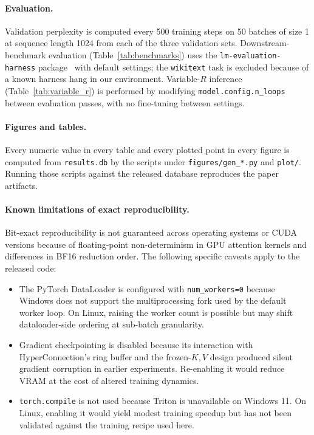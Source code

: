 \documentclass{article}
\begin{document}
\paragraph{Evaluation.}
Validation perplexity is computed every 500 training steps on 50 batches of size 1 at sequence length 1024 from each of the three validation sets. Downstream-benchmark evaluation (Table~\ref{tab:benchmarks}) uses the \texttt{lm-evaluation-harness} package~\citep{eval-harness} with default settings; the \texttt{wikitext} task is excluded because of a known harness hang in our environment. Variable-$R$ inference (Table~\ref{tab:variable_r}) is performed by modifying \texttt{model.config.n\_loops} between evaluation passes, with no fine-tuning between settings.

\paragraph{Figures and tables.}
Every numeric value in every table and every plotted point in every figure is computed from \texttt{results.db} by the scripts under \texttt{figures/gen\_*.py} and \texttt{plot/}. Running those scripts against the released database reproduces the paper artifacts.

\paragraph{Known limitations of exact reproducibility.}
Bit-exact reproducibility is not guaranteed across operating systems or CUDA versions because of floating-point non-determinism in GPU attention kernels and differences in BF16 reduction order. The following specific caveats apply to the released code:

\begin{itemize}[leftmargin=*, topsep=2pt, itemsep=1pt]
  \item The PyTorch DataLoader is configured with \texttt{num\_workers=0} because Windows does not support the multiprocessing fork used by the default worker loop. On Linux, raising the worker count is possible but may shift dataloader-side ordering at sub-batch granularity.
  \item Gradient checkpointing is disabled because its interaction with HyperConnection's ring buffer and the frozen-$K, V$ design produced silent gradient corruption in earlier experiments. Re-enabling it would reduce VRAM at the cost of altered training dynamics.
  \item \texttt{torch.compile} is not used because Triton is unavailable on Windows 11. On Linux, enabling it would yield modest training speedup but has not been validated against the training recipe used here.
\end{itemize}
\end{document}
